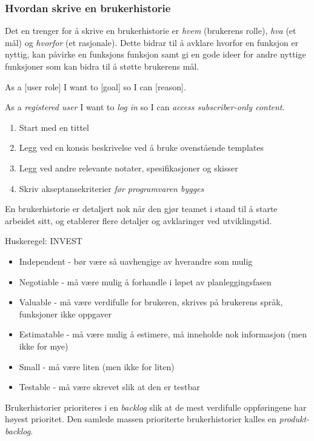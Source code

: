 \subsubsection{Hvordan skrive en brukerhistorie}

Det en trenger for å skrive en brukerhistorie er \emph{hvem} (brukerens
rolle), \emph{hva} (et mål) og \emph{hvorfor} (et rasjonale). Dette
bidrar til å avklare hvorfor en funksjon er nyttig, kan påvirke en
funksjons funksjon samt gi en gode ideer for andre nyttige funksjoner
som kan bidra til å støtte brukerens mål.

As a {[}user role{]} I want to {[}goal{]} so I can {[}reason{]}.

As a \emph{registered user} I want to \emph{log in} so I can
\emph{access subscriber-only content}.

\begin{enumerate}[1.]
\item
  Start med en tittel
\item
  Legg ved en konsis beskrivelse ved å bruke ovenstående templates
\item
  Legg ved andre relevante notater, spesifikasjoner og skisser
\item
  Skriv akseptansekriterier \emph{før programvaren bygges}
\end{enumerate}
En brukerhistorie er detaljert nok når den gjør teamet i stand til å
starte arbeidet sitt, og etablerer flere detaljer og avklaringer ved
utviklingstid.

Huskeregel: INVEST

\begin{itemize}
\item
  Independent - bør være så uavhengige av hverandre som mulig
\item
  Negotiable - må være mulig å forhandle i løpet av planleggingsfasen
\item
  Valuable - må være verdifulle for brukeren, skrives på brukerens
  språk, funksjoner ikke oppgaver
\item
  Estimatable - må være mulig å estimere, må inneholde nok informasjon
  (men ikke for mye)
\item
  Small - må være liten (men ikke for liten)
\item
  Testable - må være skrevet slik at den er testbar
\end{itemize}
Brukerhistorier prioriteres i en \emph{backlog} slik at de mest
verdifulle oppføringene har høyest prioritet. Den samlede massen
prioriterte brukerhistorier kalles en \emph{produkt-backlog}.

